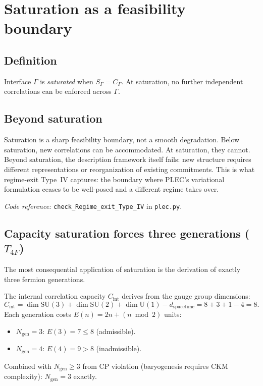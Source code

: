 \documentclass[11pt]{article}
\newcommand{\coderef}[2]{\smallskip\noindent\textit{Code reference:} \texttt{#1} in \texttt{#2}.}
\newcommand{\SU}{\mathrm{SU}}
\newcommand{\Un}{\mathrm{U}}
\newcommand{\epitag}[1]{\textbf{[#1]}}
\theoremstyle{definition}
\begin{document}
\clearpage

\section{Saturation as a feasibility boundary}\label{sec:saturation}

\subsection{Definition}\label{sec:saturation_definition}

\begin{tcolorbox}[apfbox, title={Definition 5.1 (Saturation)}]
Interface $\Gamma$ is \emph{saturated} when $S_\Gamma = C_\Gamma$. At saturation, no further independent correlations can be enforced across $\Gamma$.
\end{tcolorbox}

\subsection{Beyond saturation}\label{sec:saturation_beyond}

Saturation is a sharp feasibility boundary, not a smooth degradation. Below saturation, new correlations can be accommodated. At saturation, they cannot. Beyond saturation, the description framework itself fails: new structure requires different representations or reorganization of existing commitments. This is what regime-exit Type~IV captures: the boundary where PLEC's variational formulation ceases to be well-posed and a different regime takes over.

\coderef{check\_Regime\_exit\_Type\_IV}{plec.py}

\subsection{Capacity saturation forces three generations ($T_{4F}$)}\label{sec:T4F}

The most consequential application of saturation is the derivation of exactly three fermion generations.

\begin{tcolorbox}[apfbox, title={Theorem $T_{4F}$ (Capacity Saturation) \epitag{P\_structural}}]
The internal correlation capacity $C_{\mathrm{int}}$ derives from the gauge group dimensions:
\[
C_{\mathrm{int}} = \dim\SU(3) + \dim\SU(2) + \dim\Un(1) - d_{\mathrm{spacetime}} = 8 + 3 + 1 - 4 = 8.
\]
Each generation costs $E(n) = 2n + (n \bmod 2)$ units:
\begin{itemize}
    \item $N_{\mathrm{gen}} = 3$: $E(3) = 7 \leq 8$ \quad (admissible).
    \item $N_{\mathrm{gen}} = 4$: $E(4) = 9 > 8$ \quad (inadmissible).
\end{itemize}
Combined with $N_{\mathrm{gen}} \geq 3$ from CP violation (baryogenesis requires CKM complexity): $N_{\mathrm{gen}} = 3$ exactly.
\end{tcolorbox}
\end{document}
